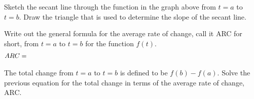 \begin{problem}
      \begin{subproblem}
      \item Sketch the secant line through the function in the graph above
        from $t=a$ to $t=b$. Draw the triangle that is used to determine
        the slope of the secant line.
      \item Write out the general formula for the average rate of change,
        call it ARC for short, from $t=a$ to $t=b$ for the function
        $f(t)$.
        \begin{eqnarray*}
          ARC & = & \hskip \textwidth
        \end{eqnarray*}
        \vspace{2em}
      \item The total change from $t=a$ to $t=b$ is defined to be
        $f(b)-f(a)$. Solve the previous equation for the total change in
        terms of the average rate of change, ARC.
        \vfill
      \end{subproblem}

\end{problem}

\postClass

